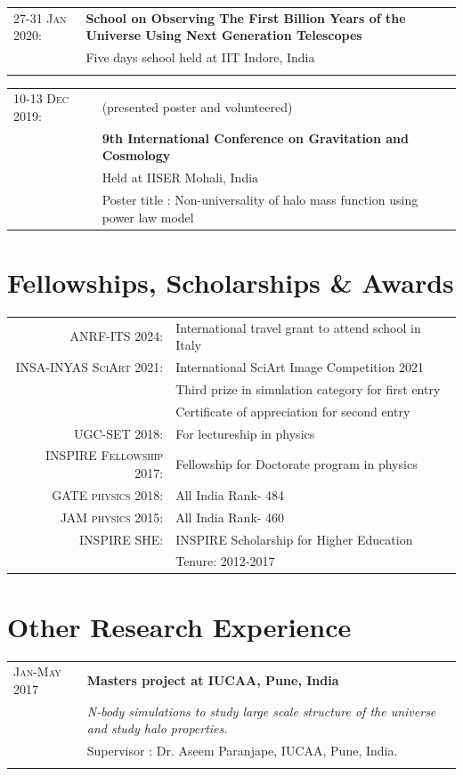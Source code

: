 \documentclass[a4paper,10pt]{article}
\begin{document}
\begin{tabular}{p{2.5cm} p{11cm}}
 \textsc{27-31 Jan 2020:} & \textbf{{School on Observing The First Billion Years of the Universe Using Next Generation Telescopes} }\\
 & \footnotesize{Five days school held at IIT Indore, India}\\ \\
\end{tabular}

\begin{tabular}{p{2.5cm} p{11cm}}
\textsc{10-13 Dec 2019:} & {(presented poster and volunteered)}\\ 
& \textbf{{9th International Conference on Gravitation and Cosmology} }\\
& \footnotesize{Held at IISER Mohali, India}\\
& \footnotesize{Poster title : Non-universality of halo mass function using power law model}\\
\end{tabular}

\section{Fellowships, Scholarships \& Awards}
\begin{tabular}{rl}
 \textsc{ANRF-ITS 2024:}& International travel grant to attend school in Italy \\
 \textsc{INSA-INYAS SciArt 2021:}&International SciArt Image Competition 2021 \\& Third prize in simulation category for first entry\\ & Certificate of appreciation for second entry\\
 \textsc{UGC-SET 2018:}&For lectureship in physics \\
 \textsc{INSPIRE Fellowship 2017:}&Fellowship for Doctorate program in physics \\
 \textsc{GATE physics 2018:}& All India Rank- 484\\
 \textsc{JAM physics 2015:}& All India Rank- 460\\
\textsc{INSPIRE SHE:}&INSPIRE Scholarship for Higher Education\\& Tenure: 2012-2017\\

\end{tabular}


\section{Other Research Experience}
\begin{tabular}{p{2.3cm} p{11cm}}

\textsc{Jan-May 2017}  & \textbf{Masters project at IUCAA, Pune, India} \\
&\textit{N-body simulations to study large scale structure of the universe and study halo properties.}\\
& \footnotesize{Supervisor : Dr. Aseem Paranjape, IUCAA, Pune, India.}\\
\\
\end{tabular}
\end{document}
